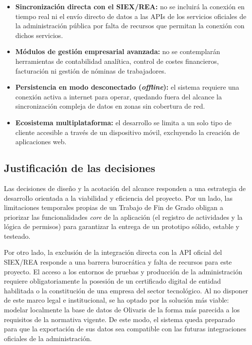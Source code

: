 \begin{itemize}
    \item \textbf{Sincronización directa con el SIEX/REA:} no se incluirá la conexión en tiempo real ni el envío directo de datos a las APIs de los servicios oficiales de la administración pública por falta de recursos que permitan la conexión
    con dichos servicios.

    \item \textbf{Módulos de gestión empresarial avanzada:} no se contemplarán herramientas de contabilidad analítica, control de costes financieros, facturación ni gestión de nóminas de trabajadores.
    
    \item \textbf{Persistencia en modo desconectado (\textit{offline}):} el sistema requiere una conexión activa a internet para operar, quedando fuera del alcance la sincronización compleja de datos en zonas sin cobertura de red.
     
    \item \textbf{Ecosistema multiplataforma:} el desarrollo se limita a un solo tipo de cliente accesible a través de un dispositivo móvil, excluyendo la creación de aplicaciones web.
\end{itemize}

\subsection{Justificación de las decisiones}

Las decisiones de diseño y la acotación del alcance responden a una estrategia de desarrollo orientada a la viabilidad y eficiencia del proyecto. Por un lado, las limitaciones temporales propias de un Trabajo de Fin de Grado obligan a priorizar 
las funcionalidades \textit{core} de la aplicación (el registro de actividades y la lógica de permisos) para garantizar la entrega de un prototipo sólido, estable y testeado.

Por otro lado, la exclusión de la integración directa con la API oficial del SIEX/REA responde a una barrera burocrática y falta de recursos para este proyecto. El acceso a los entornos de pruebas y producción de la administración requiere 
obligatoriamente la posesión de un certificado digital de entidad habilitada o la constitución de una empresa del sector tecnológico. Al no disponer de este marco legal e institucional, se ha optado por la solución más viable: modelar localmente 
la base de datos de Olivaris de la forma más parecida a los requisitos de la normativa vigente. De este modo, el sistema queda preparado para que la exportación de sus datos sea compatible con las futuras integraciones oficiales de la administración.
